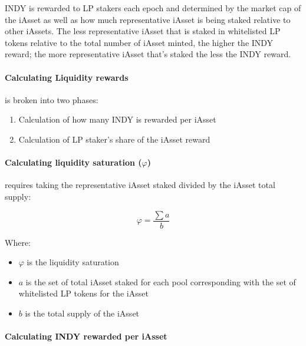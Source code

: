 \documentclass{article}
\begin{document}
\begin{sloppypar}
INDY is rewarded to LP stakers each epoch and determined by the market
cap of the iAsset as well as how much representative iAsset is being
staked relative to other iAssets. The less representative iAsset that is
staked in whitelisted LP tokens relative to the total number of iAsset
minted, the higher the INDY reward; the more representative iAsset
that's staked the less the INDY reward.

\hypertarget{calculating-liquidity-rewards}{%
\paragraph{Calculating Liquidity
rewards}\label{calculating-liquidity-rewards}}

is broken into two phases:

\begin{enumerate}
\item
  Calculation of how many INDY is rewarded per iAsset
\item
  Calculation of LP staker's share of the iAsset reward
\end{enumerate}

\hypertarget{calculating-liquidity-saturation-varphi}{%
\paragraph{\texorpdfstring{Calculating liquidity saturation
(\(\varphi\))}{Calculating liquidity saturation (\textbackslash varphi)}}\label{calculating-liquidity-saturation-varphi}}

requires taking the representative iAsset staked divided by the iAsset
total supply:

\[\varphi = \frac{\sum a}{b}\]

Where:

\begin{itemize}
\item
  \(\varphi\) is the liquidity saturation
\item
  \(a\) is the set of total iAsset staked for each pool corresponding
  with the set of whitelisted LP tokens for the iAsset
\item
  \(b\) is the total supply of the iAsset
\end{itemize}

\hypertarget{calculating-indy-rewarded-per-iasset}{%
\paragraph{Calculating INDY rewarded per
iAsset}\label{calculating-indy-rewarded-per-iasset}}


\end{sloppypar}
\end{document}
